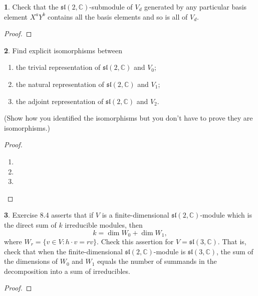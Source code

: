 \documentclass[12pt]{article}
\renewcommand{\sl}{\mathfrak{sl}}
\theoremstyle{definition}
\newtheorem{ex}{}
\begin{document}
\begin{ex}
	Check that the $\sl(2, \mathbb{C})$-submodule of $V_d$ generated by any particular basis element $X^aY^b$ contains all the basis elements and so is all of $V_d$.
\end{ex}
\begin{proof}

\end{proof}

\begin{ex}
	Find explicit isomorphisms between
	\begin{enumerate}[label=(\roman*)]
		\item the trivial representation of $\sl(2, \mathbb{C})$ and $V_0$;
		\item the natural representation of $\sl(2, \mathbb{C})$ and $V_1$;
		\item the adjoint representation of $\sl(2, \mathbb{C})$ and $V_2$.
	\end{enumerate}
	(Show how you identified the isomorphisms but you don't have to prove they are isomorphisms.)
\end{ex}
\begin{proof}\
	\begin{enumerate}[label=(\roman*)]
		\item
		\item
		\item
	\end{enumerate}
\end{proof}

\begin{ex}
	Exercise 8.4 asserts that if $V$ is a finite-dimensional $\sl(2, \mathbb{C})$-module which is the direct sum of $k$ irreducible modules, then \begin{equation*}
		k = \dim W_0 + \dim W_1,
	\end{equation*}
	where $W_r = \lbrace v \in V : h \cdot v = rv \rbrace$.
	Check this assertion for $V = \sl(3, \mathbb{C})$.
	That is, check that when the finite-dimensional $\sl(2, \mathbb{C})$-module is $\sl(3, \mathbb{C})$, the sum of the dimensions of $W_0$ and $W_1$ equals the number of summands in the decomposition into a sum of irreducibles.
\end{ex}
\begin{proof}

\end{proof}
\end{document}
